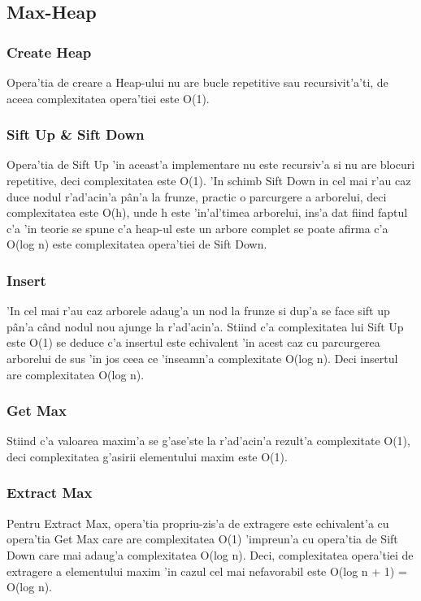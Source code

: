 \subsection{Max-Heap}
\subsubsection{Create Heap}
Opera'tia de creare a Heap-ului nu are bucle repetitive sau recursivit'a'ti, de aceea complexitatea opera'tiei este O(1).
\vspace{5 mm}
\subsubsection{Sift Up \& Sift Down}
Opera'tia de Sift Up 'in aceast'a implementare nu este recursiv'a si nu are blocuri repetitive, deci complexitatea este O(1). 'In schimb Sift Down in cel mai r'au caz duce nodul r'ad'acin'a p\^an'a la frunze, practic o parcurgere a arborelui, deci complexitatea este O(h), unde h este 'in'al'timea arborelui, ins'a dat fiind faptul c'a 'in teorie se spune c'a heap-ul este un arbore complet se poate afirma c'a O(log n) este complexitatea opera'tiei de Sift Down.
\vspace{5 mm}
\subsubsection{Insert}
'In cel mai r'au caz arborele adaug'a un nod la frunze si dup'a se face sift up p\^an'a c\^and nodul nou ajunge la r'ad'acin'a. Stiind c'a complexitatea lui Sift Up este O(1) se deduce c'a insertul este echivalent 'in acest caz cu parcurgerea arborelui de sus 'in jos ceea ce 'inseamn'a complexitate O(log n). Deci insertul are complexitatea O(log n).
\vspace{5 mm}
\subsubsection{Get Max}
Stiind c'a valoarea maxim'a se g'ase'ste la r'ad'acin'a rezult'a complexitate O(1), deci complexitatea g'asirii elementului maxim este O(1).
\vspace{5 mm}
\subsubsection{Extract Max}
Pentru Extract Max, opera'tia propriu-zis'a de extragere este echivalent'a cu opera'tia Get Max care are complexitatea O(1) 'impreun'a cu opera'tia de Sift Down care mai adaug'a complexitatea O(log n). Deci, complexitatea opera'tiei de extragere a elementului maxim 'in cazul cel mai nefavorabil este O(log n + 1) = O(log n).
